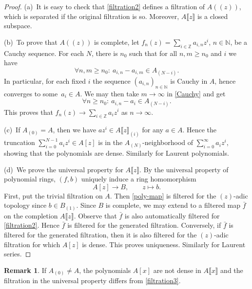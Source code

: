 \documentclass[pdftex]{sigma}
\numberwithin{equation}{section}
\theoremstyle{definition}
\newtheorem{Remark}[Theorem]{Remark}
\def\lb{\llbracket}
\def\rb{\rrbracket}
\begin{document}
\begin{proof}
 (a)~It is easy to check that \eqref{filtration2} defines a filtration of $A(\!( z)\!)$, which is separated if the original filtration is so. Moreover, $A\lb z\rb$ is a closed subspace.

 (b)~To prove that $A(\!( z)\!)$ is complete, let $f_n(z)=\sum_{i\in\mathbb{Z}} a_{i,n}z^i$, $n\in\mathbb{N}$, be a Cauchy sequence. For each $N$, there is $n_0$ such that for all $n,m\geqslant n_0$ and $i$ we have
 \begin{equation} \label{Cauchy}
 \forall n,m\geqslant n_0\colon \ a_{i,n}-a_{i,m}\in A_{(N-i)}.
 \end{equation}
 In particular, for each fixed $i$ the sequence $(a_{i,n})_{n\in\mathbb{N}}$ is Cauchy in $A$, hence converges to some~${a_i\in A}$. We may then take $m\to\infty$ in \eqref{Cauchy} and get
 \[
 \forall n\geqslant n_0\colon\ a_{i,n}-a_i\in A_{(N-i)}.
 \]
 This proves that $f_n(z)\to \sum_{i\in\mathbb{Z}} a_iz^i$ as $n\to\infty$.

 (c)~If $A_{(0)}=A$, then we have $az^i\in A\lb z\rb_{(i)}$ for any $a\in A$. Hence the truncation $\sum_{i=0}^{N-1} a_iz^i\in A[z]$ is in the $A_{(N)}$-neighborhood of $\sum_{i=0}^\infty a_iz^i$, showing that the polynomials are dense. Similarly for Laurent polynomials.

 (d)~We prove the universal property for $A\lb z\rb$. By the universal property of polynomial rings, $(f,b)$ uniquely induce a ring homomorphism
 \begin{equation}
 \label{poly-map}
 A[z]\longrightarrow B,\qquad z\longmapsto b.
 \end{equation}
 First, put the trivial filtration on $A$. Then \eqref{poly-map} is filtered for the $(z)$-adic topology since ${b\in B_{(1)}}$. Since $B$ is complete, we may extend to a filtered map $\bar{f}$ on the completion $A\lb z\rb$. Observe that $\bar{f}$ is also automatically filtered for \eqref{filtration2}. Hence $\bar{f}$ is filtered for the generated filtration. Conversely, if $\bar{f}$ is filtered for the generated filtration, then it is also filtered for the $(z)$-adic filtration for which $A[z]$ is dense. This proves uniqueness. Similarly for Laurent series.
\end{proof}

\begin{Remark}
 If $A_{(0)}\neq A$, the polynomials $A[x]$ are not dense in $A\lb x\rb$ and the filtration in the universal property differs from \eqref{filtration3}.
\end{Remark}
\end{document}
